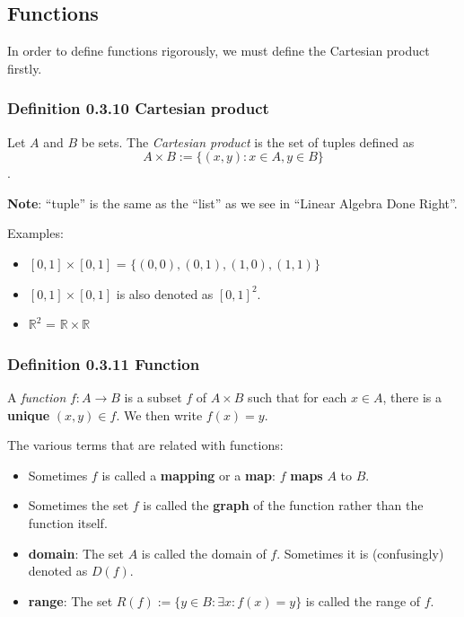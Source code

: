 \documentclass[12pt, letterpaper, oneside]{book}
\begin{document}
\subsection{Functions}

In order to define functions rigorously, we must define the Cartesian product
firstly.

\subsubsection*{Definition 0.3.10 Cartesian product}

Let $A$ and $B$ be sets. The \textit{Cartesian product} is the set of tuples
defined as \[ A \times B := \{(x, y): x \in A, y \in B \} \].

\textbf{Note}: ``tuple'' is the same as the ``list'' as we see in ``Linear
Algebra Done Right''.

Examples:
\begin{itemize}
  \item $[0,1] \times [0,1]$ = $\{(0,0), (0,1), (1,0), (1,1)\}$
  \item $[0,1] \times [0,1]$ is also denoted as $[0,1]^2$.
  \item $\mathbb{R}^2$ = $\mathbb{R} \times \mathbb{R}$
\end{itemize}

\subsubsection*{Definition 0.3.11 Function}

A \textit{function} $f: A \rightarrow B$ is a subset $f$ of $A \times B$ such
that for each $x \in A$, there is a \textbf{unique} $(x,y) \in f$. We then
write $f(x) = y$.

The various terms that are related with functions:
\begin{itemize}
  \item Sometimes $f$ is called a \textbf{mapping} or a \textbf{map}: $f$
    \textbf{maps} $A$ to $B$.
  \item Sometimes the set $f$ is called the \textbf{graph} of the function
    rather than the function itself.
  \item \textbf{domain}: The set $A$ is called the domain of $f$. Sometimes it
    is (confusingly) denoted as $D(f)$.
  \item \textbf{range}: The set $R(f) := \{y \in B: \exists x: f(x) = y\}$ is
    called the range of $f$.
\end{itemize}
\end{document}
